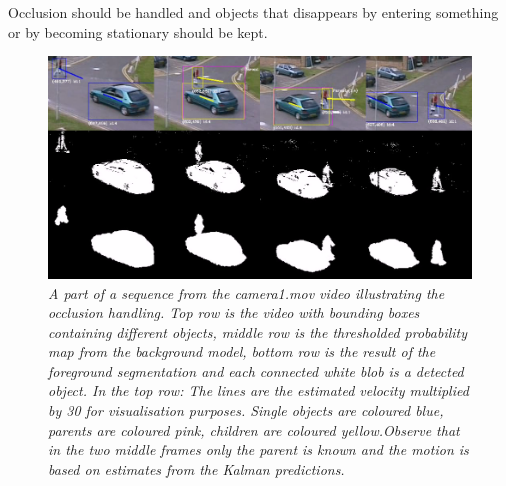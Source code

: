 Occlusion should be handled and objects that disappears by entering something or by becoming stationary should be kept.

\begin{figure}[htb]
	\centering
	\includegraphics[width=\linewidth]{images/occlusionIllustration1.png}
	\caption{\textit{A part of a sequence from the camera1.mov video illustrating the occlusion handling. Top row is the video with bounding boxes containing different objects, middle row is the thresholded probability map from the background model, bottom row is the result of the foreground segmentation and each connected white blob is a detected object. In the top row: The lines are the estimated velocity multiplied by 30 for visualisation purposes. Single objects are coloured blue, parents are coloured pink, children are coloured yellow.Observe that in the two middle frames only the parent is known and the motion is based on estimates from the Kalman predictions. }}
	\label{fig:UML_fig} %
\end{figure}

